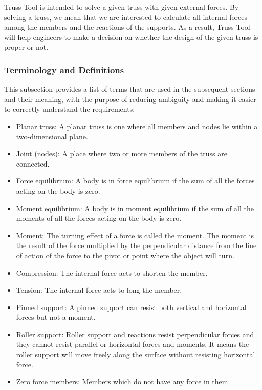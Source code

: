 \documentclass[12pt]{article}
\begin{document}
Truss Tool is intended to solve a given truss with given external forces. By solving a truss, we mean that we are interested to calculate all internal forces among the members and the reactions of the supports. As a result, Truss Tool will help engineers to make a decision on whether the design of the given truss is proper or not.


\subsubsection{Terminology and  Definitions}


This subsection provides a list of terms that are used in the subsequent
sections and their meaning, with the purpose of reducing ambiguity and making it easier to correctly understand the requirements:

\begin{itemize}

\item{ Planar truss:  A planar truss is one where all members and nodes lie within a two-dimensional plane.} 
\item{Joint (nodes): A place where two or more  members of the truss  are connected.}
\item{Force equilibrium: A body is in force equilibrium if the sum of all the forces acting on the body is zero.}
\item{Moment equilibrium: A body is in moment equilibrium if the sum of all the moments of all the forces acting on the body is zero.}
\item{Moment: The turning effect of a force is called the moment. The moment is the result of the force multiplied by the perpendicular distance from the line of action of the force to the pivot or point where the object will turn.}
\item{Compression: The internal force acts to shorten the member.}
\item{Tension: The internal force acts to long the member.}
\item{Pinned support: A pinned support can resist both vertical and horizontal forces but not a moment. }
\item{Roller support: Roller support and reactions resist perpendicular forces and they cannot resist parallel or horizontal forces and moments. It means the roller support will move freely along the surface without resisting horizontal force. }
\item{Zero force members: Members which do not have any force in them.}
\end{itemize}
\end{document}
